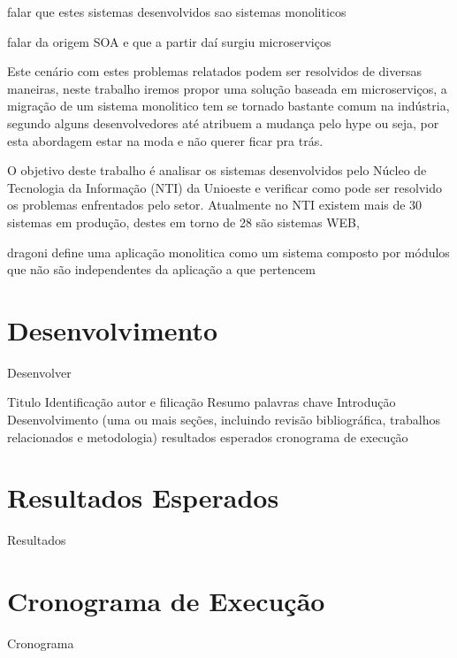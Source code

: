 \documentclass[12pt]{article}
\begin{document}
falar que estes sistemas desenvolvidos sao sistemas monoliticos \cite{Dragoni2017}

falar da origem SOA e que a partir daí surgiu microserviços

Este cenário com estes problemas relatados podem ser resolvidos de diversas maneiras, neste trabalho iremos propor uma solução baseada em microserviços, a migração de um sistema monolitico tem se tornado bastante comum na indústria, segundo \cite{Carvalho2019} alguns desenvolvedores até atribuem a mudança pelo hype ou seja, por esta abordagem estar na moda e não querer ficar pra trás.


O objetivo deste trabalho é analisar os sistemas desenvolvidos pelo Núcleo de Tecnologia da Informação (NTI) da Unioeste e verificar como pode ser resolvido os problemas enfrentados pelo setor. Atualmente no NTI existem mais de 30 sistemas em produção, destes em torno de 28 são sistemas WEB, 


dragoni define uma aplicação monolitica como um sistema composto por módulos que não são independentes da aplicação a que pertencem



\section{Desenvolvimento} \label{sec:firstpage}

Desenvolver

Titulo
Identificação autor e filicação
Resumo
palavras chave
Introdução
Desenvolvimento (uma ou mais seções, incluindo revisão bibliográfica, trabalhos relacionados e metodologia)
resultados esperados
cronograma de execução

\section{Resultados Esperados}

Resultados

\section{Cronograma de Execução}

Cronograma





\end{document}
